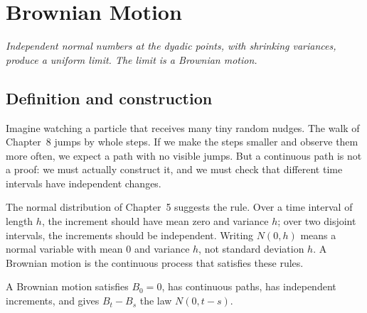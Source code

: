 \chapter{Brownian Motion}

\begin{center}\itshape
Independent normal numbers at the dyadic points, with shrinking variances,\\
produce a uniform limit. The limit is a Brownian motion.
\end{center}

\section{Definition and construction}

Imagine watching a particle that receives many tiny random nudges. The walk of Chapter~8 jumps by whole steps. If we make the steps smaller and observe them more often, we expect a path with no visible jumps. But a continuous path is not a proof: we must actually construct it, and we must check that different time intervals have independent changes.

The normal distribution of Chapter~5 suggests the rule. Over a time interval of length $h$, the increment should have mean zero and variance $h$; over two disjoint intervals, the increments should be independent. Writing $N(0,h)$ means a normal variable with mean $0$ and variance $h$, not standard deviation $h$. A Brownian motion is the continuous process that satisfies these rules.

\begin{definition}\label{def:bm}
A Brownian motion satisfies $B_0=0$, has continuous paths, has independent increments, and gives $B_t-B_s$ the law $N(0,t-s)$.
\end{definition}

